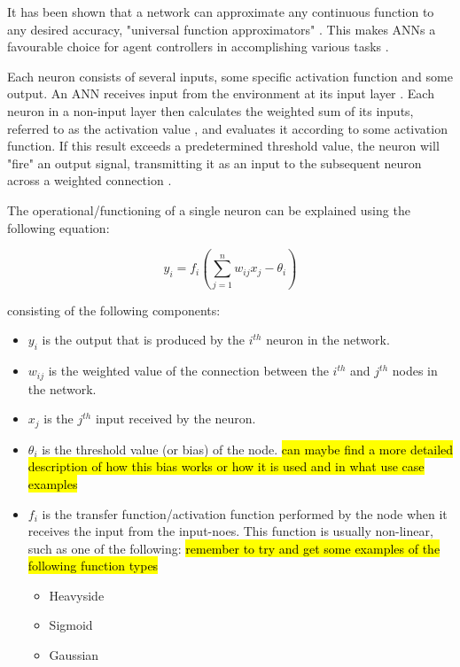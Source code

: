 It has been shown that a network can approximate any continuous function to any desired accuracy, "universal function approximators" \cite{zhang1998forecasting}. This makes ANNs a favourable choice for agent controllers in accomplishing various tasks \cite{yegnanarayana2009artificial}.


Each neuron consists of several inputs, some specific activation function and some output. 
An ANN receives input from the environment at its input layer \cite{RefWorks:32}.
Each neuron in a non-input layer then calculates the weighted sum of its inputs, referred to as the activation value \cite{yegnanarayana2009artificial,RefWorks:31}, and evaluates it according to some activation function. 
If this result exceeds a predetermined threshold value, the neuron will "fire" an output signal, transmitting it as an input to the subsequent neuron across a weighted connection \cite{yegnanarayana2009artificial}.


The operational/functioning of a single neuron can be explained using the following equation:

\begin{equation} \label{eq:ann-transfer-function}
	y_i = f_i(\sum_{j=1}^{n} w_{ij} x_j - \theta_i)
\end{equation}

consisting of the following components:
\begin{itemize}
	\item $y_i$ is the output that is produced by the $i^{th}$ neuron in the network.
	\item $w_{ij}$ is the weighted value of the connection between the $i^{th}$ and $j^{th}$ nodes in the network.
	\item $x_j$ is the $j^{th}$ input received by the neuron.
	\item $\theta_i$ is the threshold value (or bias) of the node. \hl{can maybe find a more detailed description of how this bias works or how it is used and in what use case examples}
	\item $f_i$ is the transfer function/activation function performed by the node when it receives the input from the input-noes. This function is usually non-linear, such as one of the following: \hl{remember to try and get some examples of the following function types}
		\begin{itemize}
			\item Heavyside
			\item Sigmoid
			\item Gaussian
		\end{itemize}
\end{itemize}

